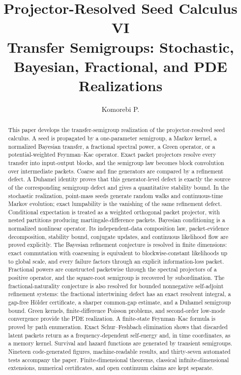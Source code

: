 \documentclass[11pt]{article}
\title{\textbf{Projector-Resolved Seed Calculus VI}\\[0.45em]
\large Transfer Semigroups: Stochastic, Bayesian, Fractional, and PDE Realizations}
\author{Komorebi P.}
\date{}
\theoremstyle{definition}
\theoremstyle{remark}
\begin{document}
\maketitle

\begin{abstract}
This paper develops the transfer-semigroup realization of the projector-resolved seed calculus. A seed is propagated by a one-parameter semigroup, a Markov kernel, a normalized Bayesian transfer, a fractional spectral power, a Green operator, or a potential-weighted Feynman--Kac operator. Exact packet projectors resolve every transfer into input-output blocks, and the semigroup law becomes block convolution over intermediate packets. Coarse and fine generators are compared by a refinement defect. A Duhamel identity proves that this generator-level defect is exactly the source of the corresponding semigroup defect and gives a quantitative stability bound. In the stochastic realization, point-mass seeds generate random walks and continuous-time Markov evolution; exact lumpability is the vanishing of the same refinement defect. Conditional expectation is treated as a weighted orthogonal packet projector, with nested partitions producing martingale-difference packets. Bayesian conditioning is a normalized nonlinear operator. Its independent-data composition law, packet-evidence decomposition, stability bound, conjugate updates, and continuous likelihood flow are proved explicitly.  The Bayesian refinement conjecture is resolved in finite dimensions: exact commutation with coarsening is equivalent to blockwise-constant likelihoods up to global scale, and every failure factors through an explicit information-loss packet. Fractional powers are constructed packetwise through the spectral projectors of a positive operator, and the square-root semigroup is recovered by subordination. The fractional-naturality conjecture is also resolved for bounded nonnegative self-adjoint refinement systems: the fractional intertwining defect has an exact resolvent integral, a gap-free Hölder certificate, a sharper common-gap estimate, and a Duhamel semigroup bound. Green kernels, finite-difference Poisson problems, and second-order low-mode convergence provide the PDE realization. A finite-state Feynman--Kac formula is proved by path enumeration. Exact Schur--Feshbach elimination shows that discarded latent packets return as a frequency-dependent self-energy and, in time coordinates, as a memory kernel. Survival and hazard functions are generated by transient semigroups. Nineteen code-generated figures, machine-readable results, and thirty-seven automated tests accompany the paper. Finite-dimensional theorems, classical infinite-dimensional extensions, numerical certificates, and open continuum claims are kept separate.
\end{abstract}
\end{document}
